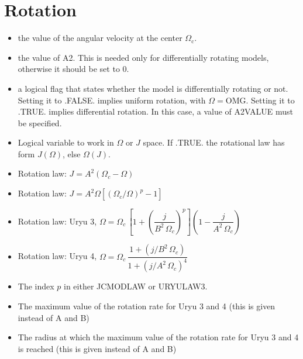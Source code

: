 \documentclass[letterpaper,10pt,english]{sphinxmanual}
\begin{document}
\section{Rotation}
\label{\detokenize{user_params:rotation}}
\sphinxAtStartPar
{}
\begin{itemize}
\item {} 
\sphinxAtStartPar
{} \sphinxhyphen{} the value of the angular velocity at the center \(\Omega _\mathrm{c}\).


\item {} 
\sphinxAtStartPar
{} \sphinxhyphen{} the value of A2. This is needed only for differentially rotating models, otherwise it should
be set to 0.


\item {} 
\sphinxAtStartPar
{} \sphinxhyphen{} a logical flag that states whether the model is differentially rotating or not. Setting it
to .FALSE. implies uniform rotation, with \(\Omega = \)OMG. Setting it to .TRUE. implies differential rotation.
In this case, a value of A2VALUE must be specified.


\item {} 
\sphinxAtStartPar
{} \sphinxhyphen{} Logical variable to work in \(\Omega\) or \(J\) space. If .TRUE. the rotational law has form \(J(\Omega)\), else \(\Omega(J)\).


\item {} 
\sphinxAtStartPar
{} \sphinxhyphen{} Rotation law: \(J = A^2(\Omega_c-\Omega)\)


\item {} 
\sphinxAtStartPar
{} \sphinxhyphen{} Rotation law: \(J= A^2\Omega[(\Omega_c/\Omega)^p-1]\)


\item {} 
\sphinxAtStartPar
{} \sphinxhyphen{} Rotation law: Uryu  3, \(\Omega = \Omega_c \, [1+(\dfrac{j}{B^2 \, \Omega_c})^p](1-\dfrac{j}{A^2 \, \Omega_c})\)


\item {} 
\sphinxAtStartPar
{} \sphinxhyphen{} Rotation law: Uryu  4, \(\Omega = \Omega_c \, \dfrac{1+(j/B^2 \, \Omega_c)}{1+(j/A^2 \, \Omega_c)^{4}}\)


\item {} 
\sphinxAtStartPar
{} \sphinxhyphen{} The index \(p\) in either JCMODLAW or URYULAW3.


\item {} 
\sphinxAtStartPar
{} \sphinxhyphen{} The maximum value of the rotation rate for Uryu  3 and 4 (this is given instead of A and B)


\item {} 
\sphinxAtStartPar
{} \sphinxhyphen{} The radius at which the maximum value of the rotation rate for Uryu  3 and 4 is reached (this is given instead of A and B)

\end{itemize}
\end{document}
